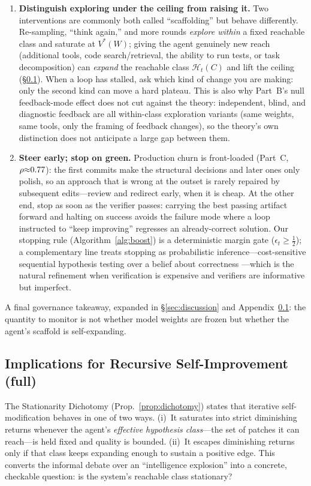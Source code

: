 \begin{enumerate}[leftmargin=*,itemsep=3pt]
    \item \textbf{Distinguish exploring under the ceiling from raising it.} Two interventions are commonly both called ``scaffolding'' but behave differently. Re-sampling, ``think again,'' and more rounds \emph{explore within} a fixed reachable class and saturate at $V^*(W)$; giving the agent genuinely new reach (additional tools, code search/retrieval, the ability to run tests, or task decomposition) can \emph{expand} the reachable class $\mathcal{H}_t(C)$ and lift the ceiling (\S\ref{app:rsi}). When a loop has stalled, ask which kind of change you are making: only the second kind can move a hard plateau. This is also why Part~B's null feedback-mode effect does not cut against the theory: independent, blind, and diagnostic feedback are all within-class exploration variants (same weights, same tools, only the framing of feedback changes), so the theory's own distinction does not anticipate a large gap between them.
    \item \textbf{Steer early; stop on green.} Production churn is front-loaded (Part~C, $\rho{\approx}0.77$): the first commits make the structural decisions and later ones only polish, so an approach that is wrong at the outset is rarely repaired by subsequent edits---review and redirect early, when it is cheap. At the other end, stop as soon as the verifier passes: carrying the best passing artifact forward and halting on success avoids the failure mode where a loop instructed to ``keep improving'' regresses an already-correct solution. Our stopping rule (Algorithm~\ref{alg:boost}) is a deterministic margin gate ($\epsilon_t \ge \tfrac12$); a complementary line treats stopping as probabilistic inference---cost-sensitive sequential hypothesis testing over a belief about correctness \citep{papamarkou2026bayesian}---which is the natural refinement when verification is expensive and verifiers are informative but imperfect.
\end{enumerate}

A final governance takeaway, expanded in \S\ref{sec:discussion} and Appendix~\ref{app:rsi}: the quantity to monitor is not whether model weights are frozen but whether the agent's scaffold is self-expanding.

\subsection{Implications for Recursive Self-Improvement (full)}
\label{app:rsi}

The Stationarity Dichotomy (Prop.~\ref{prop:dichotomy}) states that iterative self-modification behaves in one of two ways. (i)~It saturates into strict diminishing returns whenever the agent's \emph{effective hypothesis class}---the set of patches it can reach---is held fixed and quality is bounded. (ii)~It escapes diminishing returns only if that class keeps expanding enough to sustain a positive edge. This converts the informal debate over an ``intelligence explosion'' into a concrete, checkable question: is the system's reachable class stationary?

